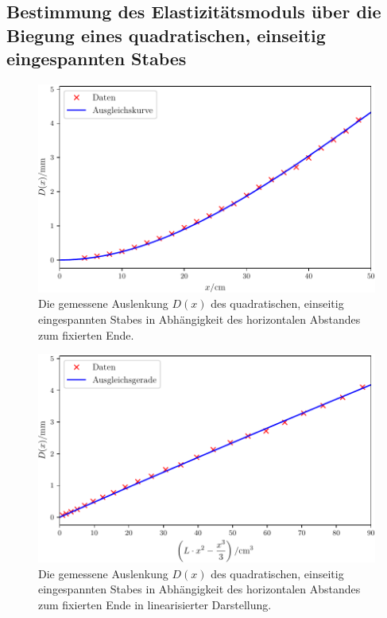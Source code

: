\subsection{Bestimmung des Elastizitätsmoduls über die Biegung eines quadratischen, einseitig eingespannten Stabes}\label{subsec:QuadratischEinseitig}

\begin{figure}
	\centering
	\includegraphics[width=\linewidth-70pt,height=\textheight-70pt,keepaspectratio]{content/images/StabQuadratEinseitig1.pdf}
	\caption{Die gemessene Auslenkung $D(x)$ des quadratischen, einseitig eingespannten Stabes in Abhängigkeit des horizontalen Abstandes zum fixierten Ende.}
	\label{fig:quadratisch}
\end{figure}
\begin{figure}
	\centering
	\includegraphics[width=\linewidth-70pt,height=\textheight-70pt,keepaspectratio]{content/images/StabQuadratEinseitig2.pdf}
	\caption{Die gemessene Auslenkung $D(x)$ des quadratischen, einseitig eingespannten Stabes in Abhängigkeit des horizontalen Abstandes zum fixierten Ende in linearisierter Darstellung.}
	\label{fig:quadratischlinear}
\end{figure}
